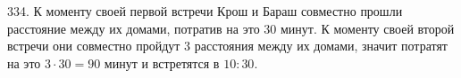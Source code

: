 334. К моменту своей первой встречи Крош и Бараш совместно прошли расстояние между их домами, потратив на это 30 минут. К моменту своей второй встречи они совместно пройдут 3 расстояния между их домами, значит потратят на это $3\cdot30=90$ минут и встретятся в $10:30.$\\
